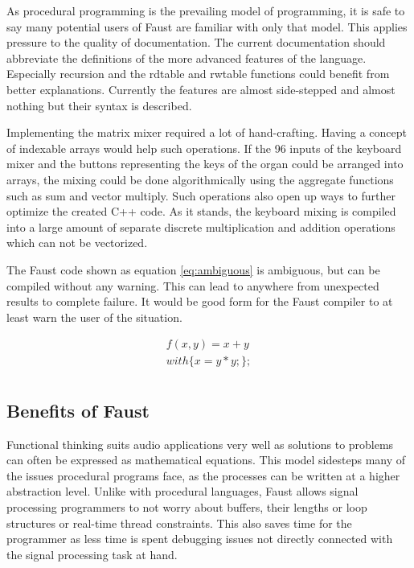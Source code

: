 \documentclass[11pt,a4paper]{article}
\begin{document}
As procedural programming is the prevailing model of programming, it is safe to say many potential users of Faust are familiar with only that model. This applies pressure to the quality of documentation. The current documentation should abbreviate the definitions of the more advanced features of the language. Especially recursion and the rdtable and rwtable functions could benefit from better explanations. Currently the features are almost side-stepped and almost nothing but their syntax is described.

Implementing the matrix mixer required a lot of hand-crafting. Having a concept of indexable arrays would help such operations. If the 96 inputs of the keyboard mixer and the buttons representing the keys of the organ could be arranged into arrays, the mixing could be done algorithmically using the aggregate functions such as sum and vector multiply. Such operations also open up ways to further optimize the created C++ code. As it stands, the keyboard mixing is compiled into a large amount of separate discrete multiplication and addition operations which can not be vectorized.

The Faust code shown as equation \ref{eq:ambiguous} is ambiguous, but can be compiled without any warning. This can lead to anywhere from unexpected results to complete failure. It would be good form for the Faust compiler to at least warn the user of the situation.

\begin{equation}
\label{eq:ambiguous}
\begin{split}
f(x , y) = x + y\\
with \{ x = y * y; \};\\
\end{split}
\end{equation}




\subsection{Benefits of Faust}

Functional thinking suits audio applications very well as solutions to problems can often be expressed as mathematical equations. This model sidesteps many of the issues procedural programs face, as the processes can be written at a higher abstraction level. Unlike with procedural languages, Faust allows signal processing programmers to not worry about buffers, their lengths or loop structures or real-time thread constraints. This also saves time for the programmer as less time is spent debugging issues not directly connected with the signal processing task at hand.
\end{document}
